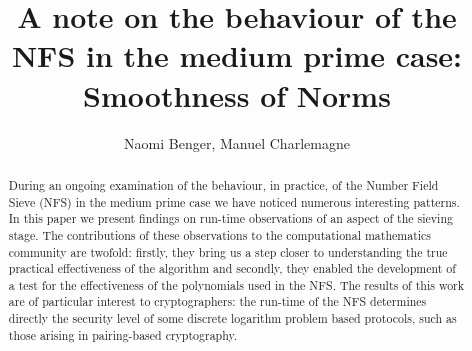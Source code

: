 \documentclass[a4paper, 10pt, envcountsect, runningheads]{lms}
\numberwithin{figure}{section}
\numberwithin{equation}{section}
\begin{document}
\title{A note on the behaviour of the NFS in the medium prime case: Smoothness of Norms}
\author{Naomi Benger, %
Manuel Charlemagne}%
\maketitle
\begin{abstract}
During an ongoing examination of the behaviour, in practice, of the Number Field Sieve (NFS) in the medium prime case we have noticed numerous interesting patterns. In this paper we present findings on run-time observations of an aspect of the sieving stage. The contributions of these observations to the computational mathematics community are twofold: firstly, they bring us a step closer to understanding the true practical effectiveness of the algorithm and secondly, they enabled the development of a test for the effectiveness of the polynomials used in the NFS. The results of this work are of particular interest to cryptographers: the run-time of the NFS determines directly the security level of some discrete logarithm problem based protocols, such as those arising in pairing-based cryptography.
\end{abstract}
\end{document}
